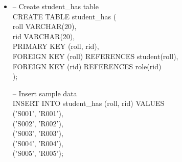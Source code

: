 \documentclass[7pt]{article}
\begin{document}
\begin{itemize}
    \item -- Create student\_has table  \\
    CREATE TABLE student\_has (  \\
        roll VARCHAR(20),   \\
        rid VARCHAR(20),    \\
        PRIMARY KEY (roll, rid),    \\
        FOREIGN KEY (roll) REFERENCES student(roll),    \\
        FOREIGN KEY (rid) REFERENCES role(rid)  \\
    ); \vspace{2pt}
    
    -- Insert sample data   \\
    INSERT INTO student\_has (roll, rid) VALUES \\
        ('S001', 'R001'),   \\
        ('S002', 'R002'),   \\
        ('S003', 'R003'),   \\
        ('S004', 'R004'),   \\
        ('S005', 'R005');
\end{itemize}

\newpage

\subsection{}

\end{document}
